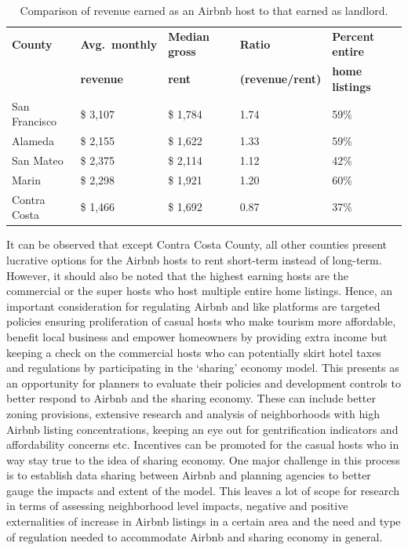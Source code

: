 \documentclass[10pt,letterpaper,onecolumn]{article}
\begin{document}
\begin{table}[H]
  \footnotesize
  \centering
  \def\arraystretch{1.1}
  \begin{tabular}{lllll}
    \toprule
    \textbf{County}        & \textbf{Avg.\ monthly} & \textbf{Median gross} & \textbf{Ratio}          & \textbf{Percent entire}\\
            & \textbf{revenue}       & \textbf{rent}         & \textbf{(revenue/rent)} & \textbf{home listings}\\
    \midrule
    San Francisco & \$ 3,107      & \$ 1,784          & 1.74                 & 59\%\\
    Alameda       & \$ 2,155      & \$ 1,622          & 1.33                 & 59\%\\
    San Mateo     & \$ 2,375      & \$ 2,114          & 1.12                 & 42\%\\
    Marin         & \$ 2,298      & \$ 1,921          & 1.20                 & 60\%\\
    Contra Costa  & \$ 1,466      & \$ 1,692          & 0.87                 & 37\%\\
    \bottomrule
  \end{tabular}
\caption{Comparison of revenue earned as an Airbnb host to that earned as landlord.}
\end{table}

It can be observed that except Contra Costa County, all other counties
present lucrative options for the Airbnb hosts to rent short-term
instead of long-term. However, it should also be noted that the highest
earning hosts are the commercial or the super hosts who host multiple
entire home listings. Hence, an important consideration for regulating
Airbnb and like platforms are targeted policies ensuring proliferation
of casual hosts who make tourism more affordable, benefit local business
and empower homeowners by providing extra income but keeping a check on
the commercial hosts who can potentially skirt hotel taxes and
regulations by participating in the `sharing' economy model. This
presents as an opportunity for planners to evaluate their policies and
development controls to better respond to Airbnb and the sharing
economy. These can include better zoning provisions, extensive research
and analysis of neighborhoods with high Airbnb listing concentrations,
keeping an eye out for gentrification indicators and affordability
concerns etc. Incentives can be promoted for the casual hosts who in way
stay true to the idea of sharing economy. One major challenge in this
process is to establish data sharing between Airbnb and planning
agencies to better gauge the impacts and extent of the model. This
leaves a lot of scope for research in terms of assessing neighborhood
level impacts, negative and positive externalities of increase in Airbnb
listings in a certain area and the need and type of regulation needed to
accommodate Airbnb and sharing economy in general.
\end{document}
